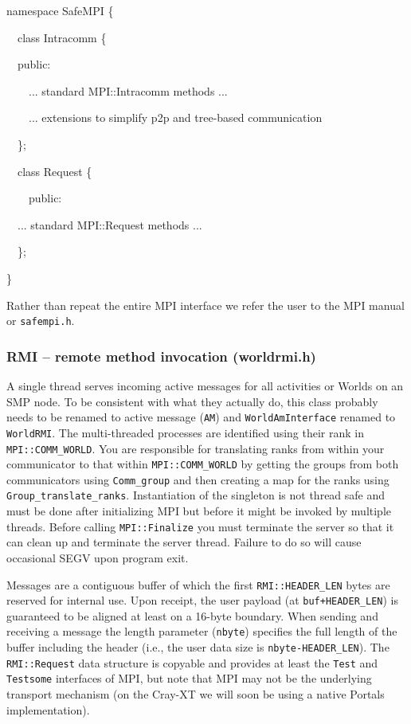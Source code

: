 \documentclass[letterpaper]{article}
\begin{document}
{\ttfamily
namespace SafeMPI \{}

{\ttfamily
\ \ class Intracomm \{}

{\ttfamily
\ \ public:}

{\ttfamily
\ \ \ \ ... standard MPI::Intracomm methods ...}

{\ttfamily
\ \ \ \ ... extensions to simplify p2p and tree-based communication}

{\ttfamily
\ \ \};}


\bigskip

{\ttfamily
\ \ class Request \{}

{\ttfamily
\ \ \ \ public:}

{\ttfamily
\ \ ... standard MPI::Request methods ...}

{\ttfamily
\ \ \};}

{\ttfamily
\}}

Rather than repeat the entire MPI interface we refer the user to the MPI manual or \texttt{safempi.h}. 

\subsubsection{RMI -- remote method invocation (worldrmi.h)}
A single thread serves incoming active messages for all activities or Worlds on an SMP node. To be consistent with what
they actually do, this class probably needs to be renamed to active message (\texttt{AM}) and \texttt{WorldAmInterface}
renamed to \texttt{WorldRMI}. The multi-threaded processes are identified using their rank in
\texttt{MPI::COMM\_WORLD}. You are responsible for translating ranks from within your communicator to that within
\texttt{MPI::COMM\_WORLD} by getting the groups from both communicators using \texttt{Comm\_group} and then creating a
map for the ranks using \texttt{Group\_translate\_ranks}. Instantiation of the singleton is not thread safe and must be
done after initializing MPI but before it might be invoked by multiple threads. Before calling \texttt{MPI::Finalize}
you must terminate the server so that it can clean up and terminate the server thread. Failure to do so will cause
occasional SEGV upon program exit.

Messages are a contiguous buffer of which the first \texttt{RMI::HEADER\_LEN} bytes are reserved for internal use. Upon
receipt, the user payload (at \texttt{buf+HEADER\_LEN}) is guaranteed to be aligned at least on a 16-byte boundary.
When sending and receiving a message the length parameter (\texttt{nbyte}) specifies the full length of the buffer
including the header (i.e., the user data size is \texttt{nbyte-HEADER\_LEN}). The \texttt{RMI::Request} data structure
is copyable and provides at least the \texttt{Test} and \texttt{Testsome} interfaces of MPI, but note that MPI may not
be the underlying transport mechanism (on the Cray-XT we will soon be using a native Portals implementation).
\end{document}
